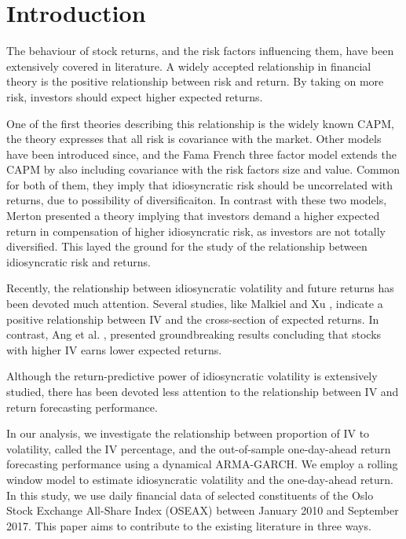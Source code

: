 \chapter{Introduction}
The behaviour of stock returns, and the risk factors influencing them, have been extensively covered in literature. A widely accepted relationship in financial theory is the positive relationship between risk and return. By taking on more risk, investors should expect higher expected returns.

One of the first theories describing this relationship is the widely known CAPM, the theory expresses that all risk is covariance with the market. Other models have been introduced since, and the Fama French three factor model \cite{famafrench} extends the CAPM by also including covariance with the risk factors size and value. Common for both of them, they imply that idiosyncratic risk should be uncorrelated with returns, due to possibility of diversificaiton. In contrast with these two models, Merton \cite{merton87} presented a theory implying that investors demand a higher expected return in compensation of higher idiosyncratic risk, as investors are not totally diversified. This layed the ground for the study of the relationship between idiosyncratic risk and returns.

Recently, the relationship between idiosyncratic volatility and future returns has been devoted much attention. Several studies, like Malkiel and Xu \cite{malkielxu02}, indicate a positive relationship between IV and the cross-section of expected returns. In contrast, Ang et al. \cite{angetal06}, presented groundbreaking results concluding that stocks with higher IV earns lower expected returns.

Although the return-predictive power of idiosyncratic volatility is extensively studied, there has been devoted less attention to the relationship between IV and return forecasting performance. 

In our analysis, we investigate the relationship between proportion of IV to volatility, called the IV percentage, and the out-of-sample one-day-ahead return forecasting performance using a dynamical ARMA-GARCH. We employ a rolling window model to estimate idiosyncratic volatility and the one-day-ahead return. In this study, we use daily financial data of selected constituents of the Oslo Stock Exchange All-Share Index (OSEAX) between January 2010 and September 2017. This paper aims to contribute to the existing literature in three ways. 

